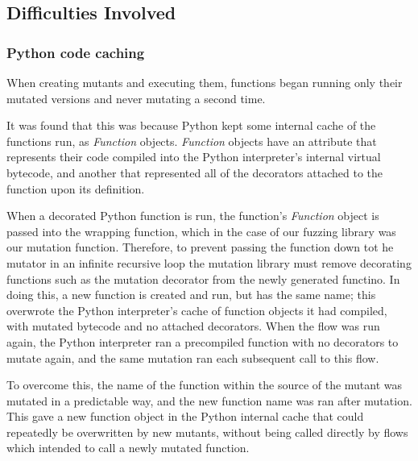 \subsection{Difficulties Involved}
\subsubsection{Python code caching}
When creating mutants and executing them, functions began running only their mutated versions and never mutating a second time. \par
It was found that this was because Python kept some internal cache of the functions run, as \emph{Function} objects. \emph{Function} objects have an attribute that represents their code compiled into the Python interpreter's internal virtual bytecode, and another that represented all of the decorators attached to the function upon its definition. \par
When a decorated Python function is run, the function's \emph{Function} object is passed into the wrapping function, which in the case of our fuzzing library was our mutation function. Therefore, to prevent passing the function down tot he mutator in an infinite recursive loop the mutation library must remove decorating functions such as the mutation decorator from the newly generated functino. In doing this, a new function is created and run, but has the same name; this overwrote the Python interpreter's cache of function objects it had compiled, with mutated bytecode and no attached decorators. When the flow was run again, the Python interpreter ran a precompiled function with no decorators to mutate again, and the same mutation ran each subsequent call to this flow. \par
To overcome this, the name of the function within the source of the mutant was mutated in a predictable way, and the new function name was ran after mutation. This gave a new function object in the Python internal cache that could repeatedly be overwritten by new mutants, without being called directly by flows which intended to call a newly mutated function. \par

